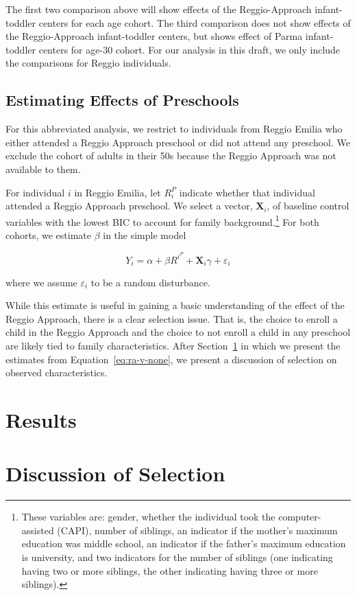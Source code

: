 The first two comparison above will show effects of the Reggio-Approach infant-toddler centers for each age cohort. The third comparison does not show effects of the Reggio-Approach infant-toddler centers, but shows effect of Parma infant-toddler centers for age-30 cohort. For our analysis in this draft, we only include the comparisons for Reggio individuals. 

\subsection{Estimating Effects of Preschools}
For this abbreviated analysis, we restrict to individuals from Reggio Emilia who either attended a Reggio Approach preschool or did not attend any preschool. We exclude the cohort of adults in their 50s because the Reggio Approach was not available to them.

For individual $i$ in Reggio Emilia, let $R_i^{P}$ indicate whether that individual attended a Reggio Approach preschool. We select a vector, $\bm{X}_i$, of baseline control variables with the lowest BIC to account for family background.\footnote{These variables are: gender, whether the individual took the computer-assisted (CAPI), number of siblings, an indicator if the mother's maximum education was middle school, an indicator if the father's maximum education is university, and two indicators for the number of siblings (one indicating having two or more siblings, the other indicating having three or more siblings).} For both cohorts, we estimate $\beta$ in the simple model

\begin{equation}
	Y_i = \alpha + \beta R^i^{P} + \bm{X}_i\gamma + \varepsilon_i
	\label{eq:ra-v-none}
\end{equation}

\noindent where we assume $\varepsilon_i$ to be a random disturbance. 

While this estimate is useful in gaining a basic understanding of the effect of the Reggio Approach, there is a clear selection issue. That is, the choice to enroll a child in the Reggio Approach and the choice to not enroll a child in any preschool are likely tied to family characteristics. After Section~\ref{sec:results} in which we present the estimates from Equation~\eqref{eq:ra-v-none}, we present a discussion of selection on observed characteristics.

\section{Results}
\label{sec:results}




\section{Discussion of Selection}
\label{sec:selection}



\clearpage

%
%


